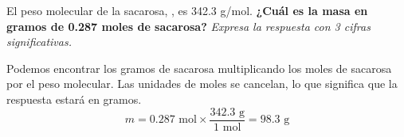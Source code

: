 El peso molecular de la sacarosa, , es 342.3 g/mol.
\textbf{¿Cuál es la masa en gramos de 0.287 moles de sacarosa?}
\emph{Expresa la respuesta con 3 cifras significativas.}

\begin{solutionbox}{4cm}
    Podemos encontrar los gramos de sacarosa multiplicando los moles de sacarosa por el peso molecular. Las unidades de moles se cancelan, lo que significa que la respuesta estará en gramos.
    \[ m =  0.287 \text{ mol} \times \frac{342.3 \text{ g}}{1 \text{ mol}} = 98.3 \text{ g} \]
\end{solutionbox}